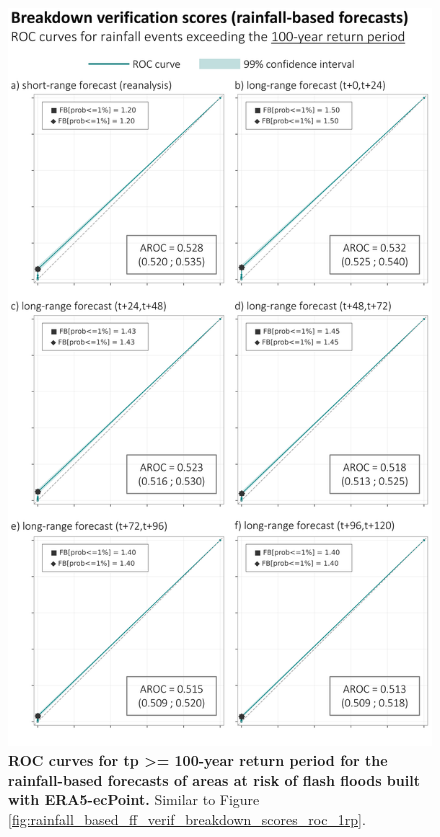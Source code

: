 \begin{figure}[htbp]
\centering
\includegraphics[width=\textwidth]{chapter_05/figures/rainfall_based_ff_verif_breakdown_scores_roc_100rp.png}
\caption{\textbf{ROC curves for tp >= 100-year return period for the rainfall-based forecasts of areas at risk of flash floods built with ERA5-ecPoint.} Similar to Figure \ref{fig:rainfall_based_ff_verif_breakdown_scores_roc_1rp}.}
\label{fig:rainfall_based_ff_verif_breakdown_scores_roc_100rp}
\end{figure}


